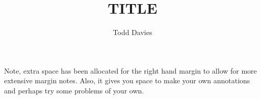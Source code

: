 \documentclass{article}
\begin{document}
\author{Todd Davies}
\title{TITLE}
\chead{}

\maketitle

{\small Note, extra space has been allocated for the right hand margin to allow
for more extensive margin notes. Also, it gives you space to make your own
annotations and perhaps try some problems of your own.}

\tableofcontents
\newpage
\end{document}

